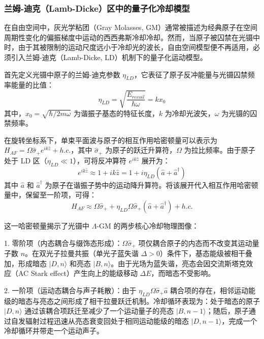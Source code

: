 \documentclass[../main.tex]{subfiles}
\begin{document}
\subsubsection{兰姆-迪克（Lamb-Dicke）区中的量子化冷却模型}

在自由空间中，灰光学粘团（Gray Molasses, GM）通常被描述为经典原子在空间周期性变化的偏振梯度中运动的西西弗斯冷却冷却。然而，当原子被囚禁在光镊中时，由于其被限制的运动尺度远小于冷却光的波长，自由空间模型便不再适用，必须引入兰姆-迪克（Lamb-Dicke, LD）机制下的量子化运动模型。

首先定义光镊中原子的兰姆-迪克参数 $\eta_{LD}$，它表征了原子反冲能量与光镊囚禁频率能量的比值：
\begin{equation}
\eta_{LD} = \sqrt{\frac{E_{recoil}}{\hbar \omega}} = k x_0
\end{equation}
其中，$x_0 = \sqrt{\hbar / 2m\omega}$ 为谐振子基态的特征长度，$k$ 为冷却光波矢，$\omega$ 为光镊的囚禁频率。

在旋转坐标系下，单束平面波与原子的相互作用哈密顿量可以表示为 $H_{AF} = \Omega \hat{\sigma}_+ e^{ik\hat{z}} + h.c.$，其中 $\hat{\sigma}_+$ 为原子的跃迁升算符，$\Omega$ 为拉比频率。由于原子处于 LD 区（$\eta_{LD} \ll 1$），可将反冲算符 $e^{ik\hat{z}}$ 展开为：
\begin{equation}
e^{ik\hat{z}} \approx 1 + ik\hat{z} = 1 + i\eta_{LD}(\hat{a} + \hat{a}^\dagger)
\end{equation}
其中 $\hat{a}$ 和 $\hat{a}^\dagger$ 为原子在谐振子势中的运动降升算符。将该展开代入相互作用哈密顿量中，保留至一阶项，可得：
\begin{equation}
H_{AF} \approx \Omega \hat{\sigma}_+ + \eta_{LD} \Omega \hat{\sigma}_+(\hat{a} + \hat{a}^\dagger) + h.c.
\end{equation}



这一哈密顿量揭示了光镊中 $\Lambda$-GM 的两步核心冷却物理图像：

1. 零阶项（内态耦合与缀饰态形成）：$\Omega \hat{\sigma}_+$ 项仅耦合原子的内态而不改变其运动量子数 $n$。在双光子拉曼共振（单光子蓝失谐 $\Delta > 0$）条件下，基态能级被相干叠加，形成暗态 $|D, n\rangle$ 和亮态 $|B, n\rangle$。由于光场为蓝失谐，亮态会因交流斯塔克效应（AC Stark effect）产生向上的能级移动 $\Delta E$，而暗态不受影响。

2. 一阶项（运动态耦合与声子耗散）：由于 $\eta_{LD} \Omega \hat{\sigma}_+ \hat{a}$ 耦合项的存在，相邻运动能级的暗态与亮态之间形成了相干拉曼跃迁机制。冷却循环表现为：处于暗态的原子 $|D, n\rangle$ 通过该耦合项跃迁至减少了一个运动量子的亮态 $|B, n-1\rangle$；随后，原子通过自发辐射过程迅速从亮态衰变回处于相同运动能级的暗态 $|D, n-1\rangle$，完成一个冷却循环并带走一个运动声子。
\end{document}
